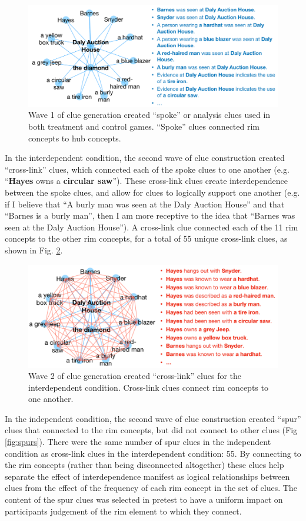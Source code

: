 \documentclass{article}
\begin{document}
\begin{figure}[h!]
\centering
\includegraphics[width=0.7\columnwidth]{Spoke Clues.png}
\caption{Wave 1 of clue generation created ``spoke'' or analysis clues used in both treatment and control games. ``Spoke'' clues connected rim concepts to hub concepts.}
\label{fig:spokes}
\end{figure}

In the interdependent condition, the second wave of clue construction created ``cross-link'' clues, which connected each of the spoke clues to one another (e.g. ``\textbf{Hayes} owns a \textbf{circular saw}''). These cross-link clues create interdependence between the spoke clues, and allow for clues to logically support one another (e.g. if I believe that ``A burly man was seen at the Daly Auction House'' and that ``Barnes is a burly man'', then I am more receptive to the idea that ``Barnes was seen at the Daly Auction House''). A cross-link clue connected each of the 11 rim concepts to the other rim concepts, for a total of 55 unique cross-link clues, as shown in Fig. \ref{fig:crosslinks}.

\begin{figure}[h!]
\centering
\includegraphics[width=0.7\columnwidth]{crosslink clues.png}
\caption{Wave 2 of clue generation created ``cross-link'' clues for the interdependent condition. Cross-link clues connect rim concepts to one another.}
\label{fig:crosslinks}
\end{figure}

In the independent condition, the second wave of clue construction created “spur” clues that connected to the rim concepts, but did not connect to other clues (Fig \ref{fig:spurs}). There were the same number of spur clues in the independent condition as cross-link clues in the interdependent condition: 55. By connecting to the rim concepts (rather than being disconnected altogether) these clues help separate the effect of interdependence manifest as logical relationships between clues from the effect of the frequency of each rim concept in the set of clues. The content of the spur clues was selected in pretest to have a uniform impact on participants judgement of the rim element to which they connect. 
\end{document}
